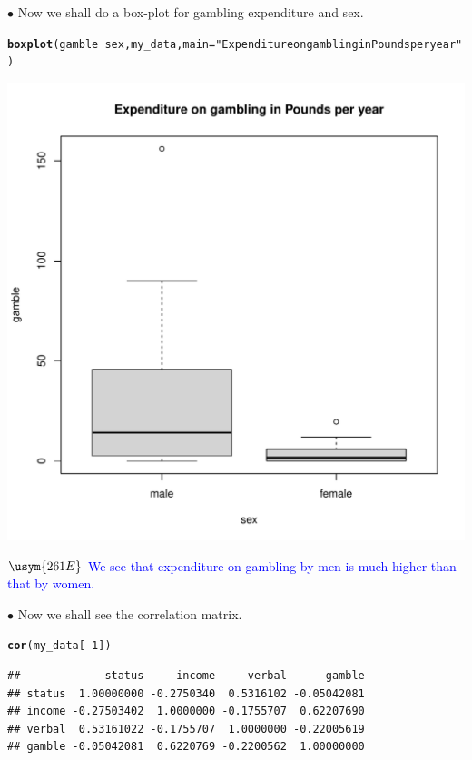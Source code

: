 \documentclass[11pt, a4paper]{article}\usepackage[]{graphicx}\usepackage[]{xcolor}
\makeatletter
\def\maxwidth{ %
  \ifdim\Gin@nat@width>\linewidth
    \linewidth
  \else
    \Gin@nat@width
  \fi
}
\newcommand{\hlnum}[1]{\textcolor[rgb]{0.686,0.059,0.569}{#1}}%
\newcommand{\hlstr}[1]{\textcolor[rgb]{0.192,0.494,0.8}{#1}}%
\newcommand{\hlopt}[1]{\textcolor[rgb]{0,0,0}{#1}}%
\newcommand{\hlstd}[1]{\textcolor[rgb]{0.345,0.345,0.345}{#1}}%
\newcommand{\hlkwc}[1]{\textcolor[rgb]{0.333,0.667,0.333}{#1}}%
\newcommand{\hlkwd}[1]{\textcolor[rgb]{0.737,0.353,0.396}{\textbf{#1}}}%
\newenvironment{kframe}{%
 \def\at@end@of@kframe{}%
 \ifinner\ifhmode%
  \def\at@end@of@kframe{\end{minipage}}%
  \begin{minipage}{\columnwidth}%
 \fi\fi%
 \def\FrameCommand##1{\hskip\@totalleftmargin \hskip-\fboxsep
 \colorbox{shadecolor}{##1}\hskip-\fboxsep
     \hskip-\linewidth \hskip-\@totalleftmargin \hskip\columnwidth}%
 \MakeFramed {\advance\hsize-\width
   \@totalleftmargin\z@ \linewidth\hsize
   \@setminipage}}%
 {\par\unskip\endMakeFramed%
 \at@end@of@kframe}
\newenvironment{knitrout}{}{} %
\makeatother
\begin{document}
\newpage

$\bullet$ Now we shall do a box-plot for gambling expenditure and sex.
\begin{knitrout}
\color{fgcolor}\begin{kframe}
\begin{alltt}
\hlkwd{boxplot}\hlstd{(gamble} \hlopt{~} \hlstd{sex, my_data,} \hlkwc{main} \hlstd{=} \hlstr{"Expenditure on gambling in Pounds per year"}\hlstd{)}
\end{alltt}
\end{kframe}
\includegraphics[width=\maxwidth]{figure/unnamed-chunk-11-1} 
\end{knitrout}

$\usym{261E}$ \textcolor{blue}{We see that expenditure on gambling by men is much higher than that by women.} \\

\newpage

$\bullet$ Now we shall see the correlation matrix.
\begin{knitrout}
\color{fgcolor}\begin{kframe}
\begin{alltt}
\hlkwd{cor}\hlstd{(my_data[}\hlopt{-}\hlnum{1}\hlstd{])}
\end{alltt}
\begin{verbatim}
##             status     income     verbal      gamble
## status  1.00000000 -0.2750340  0.5316102 -0.05042081
## income -0.27503402  1.0000000 -0.1755707  0.62207690
## verbal  0.53161022 -0.1755707  1.0000000 -0.22005619
## gamble -0.05042081  0.6220769 -0.2200562  1.00000000
\end{verbatim}
\end{kframe}
\end{knitrout}
\end{document}
